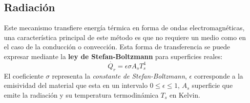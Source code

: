 \subsection{Radiación}
 Este mecanismo transfiere energía térmica en forma de ondas electromagnéticas, una característica principal de este método es que no requiere un medio como en el caso de la conducción o convección. Esta forma de transferencia se puede expresar mediante la \textbf{ley de Stefan-Boltzmann}\cite{Cengel2022} para superficies reales:
 \begin{equation}
 	\dot{Q_r}=\epsilon \sigma A_s T_{s}^4
 \end{equation}
 El coeficiente $\sigma$ representa la \textit{constante de Stefan-Boltzmann}, $\epsilon$ corresponde a la emisividad del material que esta en un intervalo $0\leq \epsilon \leq 1$, $A_s$ superficie que emite la radiación y su temperatura termodinámica $T_s$ en Kelvin. 
